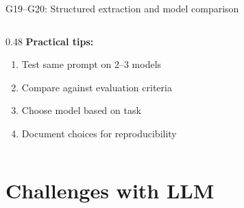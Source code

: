 \documentclass[aspectratio=169, 10pt]{beamer}
\begin{document}
\begin{frame}{G19--G20: Structured extraction and model comparison}
\begin{columns}[T]
\begin{column}{0.48\textwidth}
            \vspace{0.2cm}
            \normalsize
            \textbf{Practical tips:}
            \footnotesize
            \begin{enumerate}
                \item Test same prompt on 2--3 models
                \item Compare against evaluation criteria
                \item Choose model based on task
                \item Document choices for reproducibility
            \end{enumerate}
        \end{column}
    \end{columns}
\end{frame}

\section{Challenges with LLM}
\end{document}

